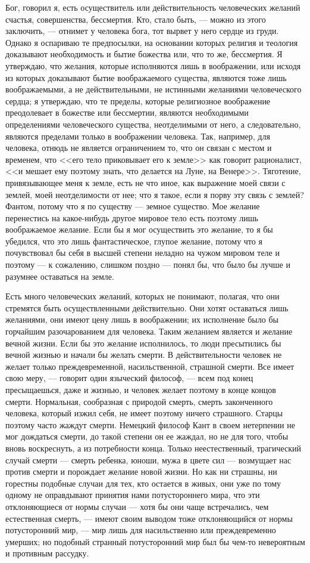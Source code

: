 \documentclass[12pt]{article}
\begin{document}
Бог, говорил я, есть осуществитель или действительность человеческих желаний счастья, совершенства, бессмертия. Кто, стало быть, --- можно из этого заключить, --- отнимет у человека бога, тот вырвет у него сердце из груди. Однако я оспариваю те предпосылки, на основании которых религия и теология доказывают необходимость и бытие божества или, что то же, бессмертия. Я утверждаю, что желания, которые исполняются лишь в воображении, или исходя из которых доказывают бытие воображаемого существа, являются тоже лишь воображаемыми, а не действительными, не истинными желаниями человеческого сердца; я утверждаю, что те пределы, которые религиозное воображение преодолевает в божестве или бессмертии, являются необходимыми определениями человеческого существа, неотделимыми от него, а следовательно, являются пределами только в воображении человека. Так, например, для человека, отнюдь не является ограничением то, что он связан с местом и временем, что <<его тело приковывает его к земле>>  как говорит рационалист, <<и мешает ему поэтому знать, что делается на Луне, на Венере>>. Тяготение, привязывающее меня к земле, есть не что иное, как выражение моей связи с землей, моей неотделимости от нее; что я такое, если я порву эту связь с землей? Фантом, потому что я по существу --- земное существо. Мое желание перенестись на какое-нибудь другое мировое тело есть поэтому лишь воображаемое желание. Если бы я мог осуществить это желание, то я бы убедился, что это лишь фантастическое, глупое желание, потому что я почувствовал бы себя в высшей степени неладно на чужом мировом теле и поэтому --- к сожалению, слишком поздно --- понял бы, что было бы лучше и разумнее оставаться на земле. 

Есть много человеческих желаний, которых не понимают, полагая, что они стремятся быть осуществленными действительно. Они хотят оставаться лишь желаниями, они имеют цену лишь в воображении; их исполнение было бы горчайшим разочарованием для человека. Таким желанием является и желание вечной жизни. Если бы это желание исполнилось, то люди пресытились бы вечной жизнью и начали бы желать смерти. В действительности человек не желает только преждевременной, насильственной, страшной смерти. Все имеет свою меру, --- говорит один языческий философ, --- всем под конец пресыщаешься, даже и жизнью, и человек желает поэтому в конце концов смерти. Нормальная, сообразная с природой смерть, смерть законченного человека, который изжил себя, не имеет поэтому ничего страшного. Старцы поэтому часто жаждут смерти. Немецкий философ Кант в своем нетерпении не мог дождаться смерти, до такой степени он ее жаждал, но не для того, чтобы вновь воскреснуть, а из потребности конца. Только неестественный, трагический случай смерти --- смерть ребенка, юноши, мужа в цвете сил --- возмущает нас против смерти и порождает желание новой жизни. Но как ни страшны, ни горестны подобные случаи для тех, кто остается в живых, они уже по тому одному не оправдывают принятия нами потустороннего мира, что эти отклоняющиеся от нормы случаи --- хотя бы они чаще встречались, чем естественная смерть, --- имеют своим выводом тоже отклоняющийся от нормы потусторонний мир, --- мир лишь для насильственно или преждевременно умерших; но подобный странный потусторонний мир был бы чем-то невероятным и противным рассудку. 
\end{document}
